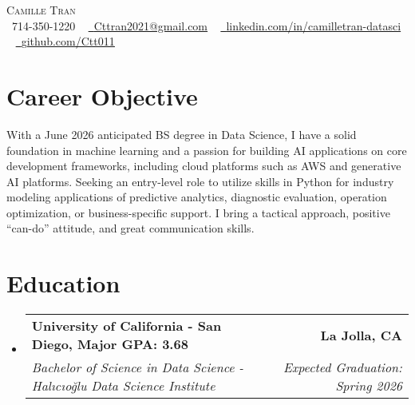 \documentclass[letterpaper,11pt]{article}
\makeatletter
\newcommand{\resumeSubheading}[4]{
  \vspace{-2pt}\item
    \begin{tabular*}{1.0\textwidth}[t]{l@{\extracolsep{\fill}}r}
      \textbf{#1} & \textbf{\small #2} \\
      \textit{\small#3} & \textit{\small #4} \\
    \end{tabular*}\vspace{-7pt}
}
\newcommand{\resumeSubHeadingListStart}{\begin{itemize}[leftmargin=0.0in, label={}]}
\newcommand{\resumeSubHeadingListEnd}{\end{itemize}}
\makeatother
\begin{document}
\begin{center}
    {\Huge \scshape Camille Tran} \\ \vspace{8pt}
    \raisebox{-0.1\height}\faPhone\ 714-350-1220 ~ 
    \href{mailto:Cttran2021@gmail.com}{\raisebox{-0.2\height}\faEnvelope\ \underline{Cttran2021@gmail.com}} ~ 
    \href{https://linkedin.com/in/camilletran-datasci}{\raisebox{-0.2\height}\faLinkedin\ \underline{linkedin.com/in/camilletran-datasci}} ~ 
    \href{https://github.com/Ctt011}{\raisebox{-0.2\height}\faGithub\ \underline{github.com/Ctt011}} 
        \vspace{-8pt}
\end{center}
\section{Career Objective}
With a June 2026 anticipated BS degree in Data Science, I have a solid foundation in machine learning and a passion for building AI applications on core development frameworks, including  cloud platforms such as AWS and generative AI platforms. Seeking an entry-level role to utilize skills in Python for industry modeling applications of predictive analytics, diagnostic evaluation, operation optimization, or business-specific support.  I bring a tactical approach, positive “can-do” attitude, and great communication skills.
\vspace{-8pt}
\section{Education}
  \resumeSubHeadingListStart
    \resumeSubheading
      {University of California - San Diego, Major GPA: 3.68}{La Jolla, CA}
      {Bachelor of Science in Data Science - Halıcıoğlu Data Science Institute}{Expected Graduation: Spring 2026}
      \vspace{2pt} %
  \resumeSubHeadingListEnd
{}
\vspace{-6pt} %
                
\end{document}
